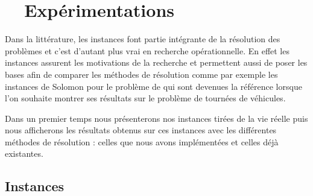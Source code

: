 
\chapter{~~Expérimentations}


Dans la littérature, les instances font partie intégrante de la résolution des problèmes et c'est d'autant plus vrai en recherche opérationnelle. 
En effet les instances assurent les motivations de la recherche et permettent aussi de poser les bases afin de comparer les méthodes de résolution comme par exemple les instances de Solomon pour le problème de \vrptw \cite{solomon1987} qui sont devenues la référence lorsque l'on souhaite montrer ses résultats sur le problème de tournées de véhicules.

Dans un premier temps nous présenterons nos instances tirées de la vie réelle puis nous afficherons les résultats obtenus sur ces instances avec les différentes méthodes de résolution : celles que nous avons implémentées et celles déjà existantes.


%

\section{Instances \label{sec:R_instances}}









